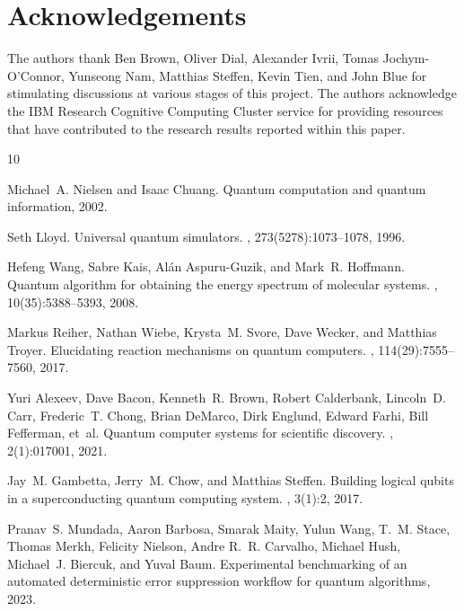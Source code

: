 \documentclass{article}
\begin{document}
\section*{Acknowledgements}
The authors thank Ben Brown, Oliver Dial, Alexander Ivrii, Tomas Jochym-O'Connor, Yunseong Nam, Matthias Steffen, Kevin Tien, and John Blue for stimulating discussions at various stages of this project.  
The authors acknowledge the IBM Research Cognitive Computing Cluster service for providing resources that have contributed to the research results reported within this paper.



\begin{thebibliography}{10}
	
	Michael~A. Nielsen and Isaac Chuang.
	\newblock Quantum computation and quantum information, 2002.
	
	Seth Lloyd.
	\newblock Universal quantum simulators.
	, 273(5278):1073--1078, 1996.
	
	Hefeng Wang, Sabre Kais, Al{\'a}n Aspuru-Guzik, and Mark~R. Hoffmann.
	\newblock Quantum algorithm for obtaining the energy spectrum of molecular
	systems.
	, 10(35):5388--5393, 2008.
	
	Markus Reiher, Nathan Wiebe, Krysta~M. Svore, Dave Wecker, and Matthias Troyer.
	\newblock Elucidating reaction mechanisms on quantum computers.
	,
	114(29):7555--7560, 2017.
	
	Yuri Alexeev, Dave Bacon, Kenneth~R. Brown, Robert Calderbank, Lincoln~D. Carr,
	Frederic~T. Chong, Brian DeMarco, Dirk Englund, Edward Farhi, Bill Fefferman,
	et~al.
	\newblock Quantum computer systems for scientific discovery.
	, 2(1):017001, 2021.
	
	Jay~M. Gambetta, Jerry~M. Chow, and Matthias Steffen.
	\newblock Building logical qubits in a superconducting quantum computing
	system.
	, 3(1):2, 2017.
	
	Pranav~S. Mundada, Aaron Barbosa, Smarak Maity, Yulun Wang, T.~M. Stace, Thomas
	Merkh, Felicity Nielson, Andre R.~R. Carvalho, Michael Hush, Michael~J.
	Biercuk, and Yuval Baum.
	\newblock Experimental benchmarking of an automated deterministic error
	suppression workflow for quantum algorithms, 2023.
	

\end{thebibliography}
\end{document}
